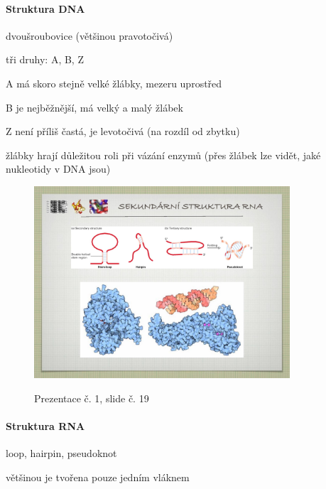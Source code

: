 \documentclass[DIV=8]{scrreprt}
\begin{document}
\paragraph{Struktura DNA}
\begin{myItemize}[nosep]
    \item dvoušroubovice (většinou pravotočivá)
    \item tři druhy: A, B, Z
\begin{myItemize}[nosep]
    \item A má skoro stejně velké žlábky, mezeru uprostřed
    \item B je nejběžnější, má velký a malý žlábek
    \item Z není příliš častá, je levotočivá (na rozdíl od zbytku)
\end{myItemize}

    \item žlábky hrají důležitou roli při vázání enzymů (přes žlábek lze vidět, jaké nukleotidy v DNA jsou)
\end{myItemize}



\begin{figure}
    \caption{Prezentace č. 1, slide č. 19}
    \includegraphics[width=0.85\textwidth]{slides-1/slide-19.jpg}
    \centering
    \label{slides-1-slide-19}
\end{figure}

\paragraph{Struktura RNA}
\begin{myItemize}[nosep]
    \item loop, hairpin, pseudoknot
    \item většinou je tvořena pouze jedním vláknem
\end{myItemize}
\end{document}
